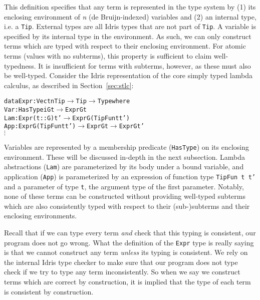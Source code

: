 This definition specifies that any term is represented in the type system by (1) its enclosing environment of \textit{n} (de Bruijn-indexed) variables and (2) an internal type, i.e. a \texttt{Tip}. External types are all Idris types that are not part of \texttt{Tip}. A variable is specified by its internal type in the environment. As such, we can only construct terms which are typed with respect to their enclosing environment. For atomic terms (values with no subterms), this property is sufficient to claim well-typedness. It is insufficient for terms with subterms, however, as these must also be well-typed. Consider the Idris representation of the core simply typed lambda calculus, as described in Section~\ref{sec:stlc}:

\begin{alltt}
  data Expr : Vect n Tip \(\rightarrow\) Tip \(\rightarrow\) Type where
    Var : HasType i G t \(\rightarrow\) Expr G t
    Lam : Expr (t :: G) t' \(\rightarrow\) Expr G (TipFun t t')
    App : Expr G (TipFun t t') \(\rightarrow\) Expr G t \(\rightarrow\) Expr G t'
    \(\vdots\)  
\end{alltt}
Variables are represented by a membership predicate (\texttt{HasType}) on its enclosing environment. These will be discussed in-depth in the next subsection. Lambda abstractions (\texttt{Lam}) are parameterized by its body under a bound variable, and application (\texttt{App}) is parameterized by an expression of function type \texttt{TipFun t t'} and a parameter of type \texttt{t}, the argument type of the first parameter. Notably, none of these terms can be constructed without providing well-typed subterms which are also consistently typed with respect to their (sub-)subterms and their enclosing environments.

Recall that if we can type every term \emph{and} check that this typing is consistent, our program does not go wrong. What the definition of the \texttt{Expr} type is really saying is that we cannot construct any term \emph{unless} its typing is consistent. We rely on the internal Idris type checker to make sure that our program does not type check if we try to type any term inconsistently. So when we say we construct terms which are correct by construction, it is implied that the type of each term is consistent by construction.
 

